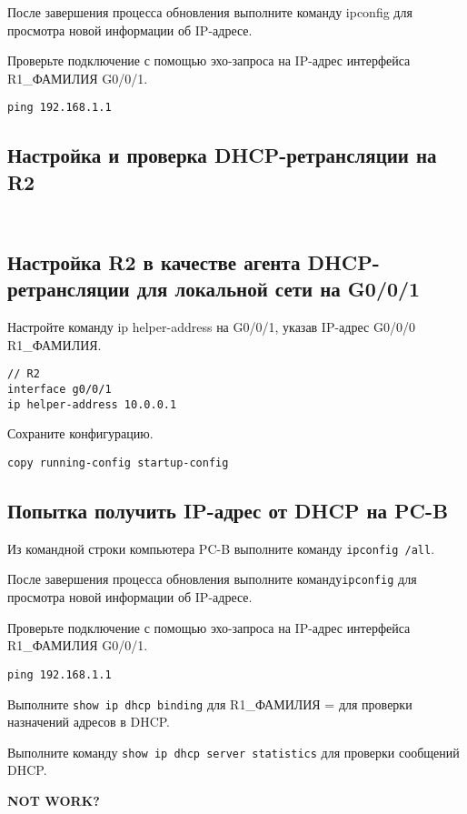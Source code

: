 После завершения процесса обновления выполните команду ipconfig для просмотра новой информации об IP-адресе.

Проверьте подключение с помощью эхо-запроса
на IP-адрес интерфейса R1\_ФАМИЛИЯ G0/0/1.

\begin{verbatim}
ping 192.168.1.1
\end{verbatim}

\subsection{Настройка и проверка DHCP-ретрансляции на R2}

\subsection{\\Настройка R2 в качестве агента DHCP-ретрансляции
для локальной сети на G0/0/1}

Настройте команду ip helper-address на G0/0/1,
указав IP-адрес G0/0/0 R1\_ФАМИЛИЯ.

\begin{verbatim}
// R2
interface g0/0/1
ip helper-address 10.0.0.1
\end{verbatim}

Сохраните конфигурацию.

\begin{verbatim}
copy running-config startup-config
\end{verbatim}

\subsection{Попытка получить IP-адрес от DHCP на PC-B}

Из командной строки компьютера PC-B выполните команду \texttt{ipconfig /all}.

После завершения процесса обновления выполните команду\texttt{ipconfig}
для просмотра новой информации об IP-адресе.

Проверьте подключение с помощью эхо-запроса
на IP-адрес интерфейса R1\_ФАМИЛИЯ G0/0/1.

\begin{verbatim}
ping 192.168.1.1
\end{verbatim}

Выполните \texttt{show ip dhcp binding} для R1\_ФАМИЛИЯ =
для проверки назначений адресов в DHCP.


Выполните команду \texttt{show ip dhcp server statistics}
для проверки сообщений DHCP.

\textbf{NOT WORK?}
